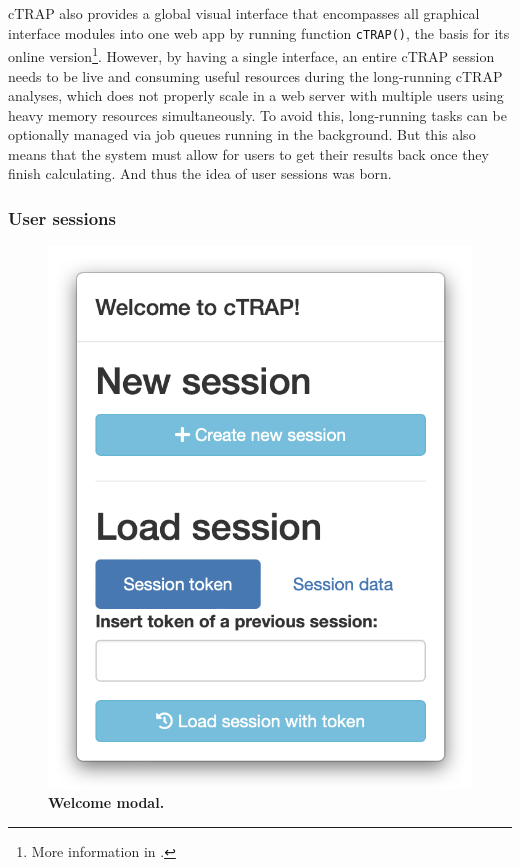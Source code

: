 cTRAP also provides a global visual interface that encompasses all graphical interface modules into one web app by running function \texttt{cTRAP()}, the basis for its online version\footnote{More information in .}. However, by having a single interface, an entire cTRAP session needs to be live and consuming useful resources during the long-running cTRAP analyses, which does not properly scale in a web server with multiple users using heavy memory resources simultaneously. To avoid this, long-running tasks can be optionally managed via job queues running in the background. But this also means that the system must allow for users to get their results back once they finish calculating. And thus the idea of user sessions was born.

\subsubsection{User sessions}
\label{sec:ctrap-web}

\begin{figure}
  \vspace{-2\intextsep}
  \includegraphics[width=\linewidth]{images/ctrap/welcome}
  \caption[Welcome screen modal]{\textbf{Welcome modal.}}
  \vspace{-1\intextsep}
  \label{fig:ctrap-welcome}
\end{figure}

